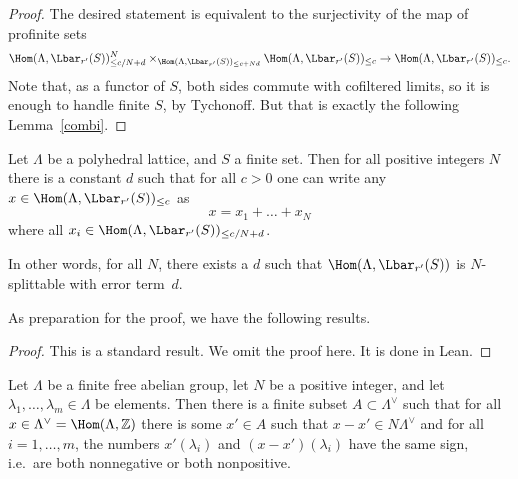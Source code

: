 \begin{proof}
  \leanok
  The desired statement is equivalent to the surjectivity of the map of profinite sets
  \[
    \Hom(\Lambda,\Lbar_{r'}(S))_{\leq c/N+d}^N\times_{\Hom(\Lambda,\Lbar_{r'}(S))_{\leq c+Nd}} \Hom(\Lambda,\Lbar_{r'}(S))_{\leq c} \to
    \Hom(\Lambda,\Lbar_{r'}(S))_{\leq c}.
  \]
  Note that, as a functor of $S$, both sides commute with cofiltered limits, so it is enough to handle finite $S$, by Tychonoff.
  But that is exactly the following Lemma~\ref{combi}.
\end{proof}

\begin{lemma}
  \label{combi}
  \leanok
  Let $\Lambda$ be a polyhedral lattice, and $S$ a finite set.
  Then for all positive integers $N$ there is a constant $d$
  such that for all $c>0$ one can write any
  $x\in \Hom(\Lambda,\Lbar_{r'}(S))_{\leq c}$ as
  \[
    x=x_1+\ldots+x_N
  \]
  where all $x_i\in \Hom(\Lambda,\Lbar_{r'}(S))_{\leq c/N+d}$.

  In other words, for all $N$, there exists a $d$ such that
  $\Hom(\Lambda, \Lbar_{r'}(S))$ is $N$-splittable with error term~$d$.
\end{lemma}

As preparation for the proof, we have the following results.


\begin{proof}
  \leanok
  This is a standard result. We omit the proof here. It is done in Lean.
\end{proof}

\begin{lemma}
  \label{combi_aux}
  \leanok
  Let $\Lambda$ be a finite free abelian group,
  let $N$ be a positive integer,
  and let $\lambda_1,\ldots,\lambda_m\in \Lambda$ be elements.
  Then there is a finite subset $A\subset \Lambda^\vee$
  such that for all $x\in \Lambda^\vee=\Hom(\Lambda,\mathbb Z)$
  there is some $x'\in A$ such that $x-x'\in N\Lambda^\vee$
  and for all $i=1,\ldots,m$,
  the numbers $x'(\lambda_i)$ and $(x-x')(\lambda_i)$ have the same sign,
  i.e.~are both nonnegative or both nonpositive.
\end{lemma}

